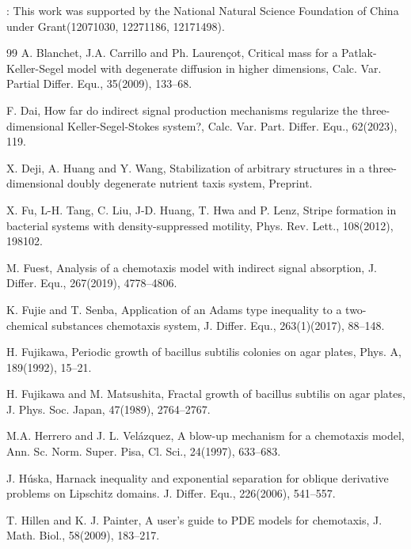 \documentclass[12pt]{article}
\theoremstyle{plain}
\theoremstyle{definition}
\numberwithin{equation}{section}
\begin{document}
: This work was supported by the National Natural Science Foundation of China under Grant(12071030, 12271186, 12171498).




\begin{thebibliography}{99}
A. Blanchet, J.A. Carrillo and Ph. Lauren\c{c}ot, Critical mass for a Patlak-Keller-Segel model with
degenerate diffusion in higher dimensions, Calc. Var. Partial Differ. Equ., 35(2009), 133--68.


F. Dai, How far do indirect signal production mechanisms regularize
the three-dimensional Keller-Segel-Stokes system?, Calc. Var. Part. Differ. Equ., 62(2023), 119.

X. Deji, A. Huang and Y. Wang, Stabilization of arbitrary structures in a three-dimensional doubly degenerate nutrient taxis system, Preprint.

X. Fu, L-H. Tang, C. Liu, J-D. Huang, T. Hwa and P. Lenz,  Stripe formation in bacterial systems
with density-suppressed motility,  Phys. Rev. Lett., 108(2012), 198102.



M. Fuest, Analysis of a chemotaxis model with indirect signal absorption, J. Differ. Equ., 267(2019), 4778--4806.


K. Fujie and T. Senba, Application of an Adams type inequality to a two-chemical substances chemotaxis system, J. Differ.  Equ.,
 263(1)(2017), 88--148.



H. Fujikawa, Periodic growth of bacillus subtilis colonies on agar plates, Phys. A, 189(1992), 15--21.

H. Fujikawa and M. Matsushita, Fractal growth of bacillus subtilis on agar plates, J. Phys. Soc. Japan, 47(1989), 2764--2767.

M.A. Herrero and J. L. Vel\'{a}zquez, A blow-up mechanism for a chemotaxis model, Ann. Sc. Norm. Super. Pisa, Cl. Sci., 24(1997), 633--683.

J. H\'{u}ska, Harnack inequality and exponential separation for oblique derivative problems on Lipschitz domains. J. Differ. Equ., 226(2006), 541--557.

T. Hillen and K. J. Painter, A user's guide to PDE models for chemotaxis, J. Math. Biol., 58(2009), 183--217.


\end{thebibliography}
\end{document}
